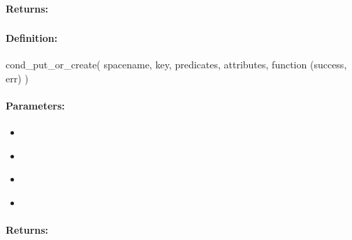 \paragraph{Returns:}


\pagebreak
\subsubsection{}
\label{api:nodejs:cond_put_or_create}


\paragraph{Definition:}
\begin{javascriptcode}
cond_put_or_create(
        spacename, key, predicates, attributes, function (success, err) {})
\end{javascriptcode}
\paragraph{Parameters:}
\begin{itemize}[noitemsep]
\item {}\\

\item {}\\

\item {}\\

\item {}\\

\end{itemize}

\paragraph{Returns:}


\pagebreak
\subsubsection{}
\label{api:nodejs:group_put}


